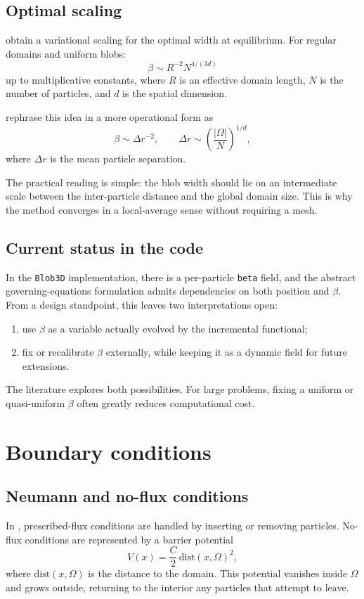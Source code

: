 \documentclass[11pt,a4paper]{article}
\begin{document}
\subsection{Optimal scaling}
\citet{pandolfi2023} obtain a variational scaling for the optimal width at equilibrium. For regular domains and uniform blobs:
\begin{equation}
\beta \sim R^{-2} N^{4/(3d)}
\end{equation}
up to multiplicative constants, where $R$ is an effective domain length, $N$ is the number of particles, and $d$ is the spatial dimension.

\citet{pandolfi2025} rephrase this idea in a more operational form as
\begin{equation}
\beta \sim \Delta r^{-2},
\qquad
\Delta r \sim \left(\frac{|\Omega|}{N}\right)^{1/d},
\end{equation}
where $\Delta r$ is the mean particle separation.

The practical reading is simple: the blob width should lie on an intermediate scale between the inter-particle distance and the global domain size. This is why the method converges in a local-average sense without requiring a mesh.

\subsection{Current status in the code}
In the \texttt{Blob3D} implementation, there is a per-particle \texttt{beta} field, and the abstract governing-equations formulation admits dependencies on both position and $\beta$. From a design standpoint, this leaves two interpretations open:
\begin{enumerate}[label=\arabic*.]
  \item use $\beta$ as a variable actually evolved by the incremental functional;
  \item fix or recalibrate $\beta$ externally, while keeping it as a dynamic field for future extensions.
\end{enumerate}

The literature explores both possibilities. For large problems, fixing a uniform or quasi-uniform $\beta$ often greatly reduces computational cost.

\section{Boundary conditions}
\subsection{Neumann and no-flux conditions}
In \citet{pandolfi2023}, prescribed-flux conditions are handled by inserting or removing particles. No-flux conditions are represented by a barrier potential
\begin{equation}
V(x)=\frac{C}{2}\,\mathrm{dist}(x,\Omega)^2,
\end{equation}
where $\mathrm{dist}(x,\Omega)$ is the distance to the domain. This potential vanishes inside $\Omega$ and grows outside, returning to the interior any particles that attempt to leave.
\end{document}
